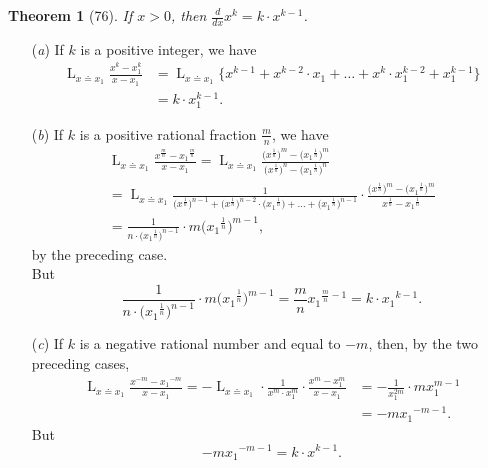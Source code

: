 \documentclass[a4paper,12pt]{book}[2004/02/16]
\providecommand{\colorbox}[2]{#2}
\newcommand{\correction}[2]{\colorbox{corr}{#1}}
\providecommand{\hypertarget}[2]{#2}
\theoremstyle{ilemma}
\theoremstyle{itheorem}
\newtheorem{theorem}{Theorem}
\theoremstyle{iother}
\theoremstyle{icorollary}
\theoremstyle{numcorollary}
\theoremstyle{idefinition}
\renewcommand{\dfrac}[2]{\frac{#1}{#2}}%
\begin{document}
\begin{theorem}[76]\hypertarget{thm76}{}\label{p122t76}
If $x>0$, then $\dfrac{d}{dx}x^k =k\cdot x^{k-1}$.
\end{theorem}
\label{p123}
\begin{enumerate}
\item[(\textit{a})] If $k$ is a positive integer, we have
\begin{align*}
   \mathop{L}_{x\doteq x_1} \frac{x^k-x_1^k}{x-x_1}
&= \mathop{L}_{x\doteq x_1}
   \bigl\{ x^{k-1} + x^{k-2}\cdot x_1 + \ldots
         + x^k\cdot x_1^{k-2}+x_1^{k-1} \bigr\}
\\
&= k\cdot x_1^{k-1}.
\end{align*}

\item[(\textit{b})] If $k$ is a positive rational fraction
$\dfrac{m}{n}$, we have
\begin{gather*}
  \mathop{L}_{x\doteq x_1}
  \frac{x^{\frac mn}-{x_1}^{\frac mn}}{x-x_1}
= \mathop{L}_{x\doteq x_1}
  \frac{\bigl(x^{\frac1n}\bigr)^m
      -\bigl({x_1}^{\frac1n}\bigr)^m}
       {\bigl(x^{\frac1n}\bigr)^n
      -\bigl({x_1}^{\frac1n}\bigr)^n}
\\
= \mathop{L}_{x\doteq x_1}
  \frac{1}{\bigl(x^{\frac1n}\bigr)^{n-1}
          + \bigl(x^{\frac1n}\bigr)^{n-2}\cdot
            \bigl({x_1}^{\frac1n}\bigr) + \ldots
          + \bigl({x_1}^{\frac1n}\bigr)^{n-1}}
  \cdot
  \frac{\bigl(x^{\frac1n}\bigr)^m
      -\bigl({x_1}^{\frac1n}\bigr)^m}
       {x^{\frac1n}-{x_1}^{\frac1n}}
\\
= \frac{1}{n\cdot \bigl({x_1}^{\frac1n}\bigr)^{n-1}} \cdot
  m \bigl({x_1}^{\frac1n}\bigr)^{m-1},
\end{gather*}
by the preceding case.\\
But
\[
  \frac{1}{n\cdot \bigl({x_1}^{\frac1n}\bigr)^{n-1}} \cdot
  m \bigl({x_1}^{\frac1n}\bigr)^{m-1}
= \frac mn{x_1}^{\frac mn-1}
= k\cdot {x_1}^{k-1}.
\]

\item[(\textit{c})] If $k$ is a negative rational number and equal to
$-m$, then, by the two preceding cases,
\begin{align*}
  \mathop{L}_{x\doteq x_1} \frac{x^{-m}-{x_1}^{-m}}{x-x_1}
=-\mathop{L}_{x\doteq x_1} \cdot
  \frac{1}{x^m \cdot x_1^m} \cdot
  \frac{x^m-x_1^m}{x-x_1}
&=-\frac{1}{x_1^{2m}} \cdot mx_1^{m-1}
\\
&=-m{x_1}^{-m-1}\text{\correction{.}{}}
\end{align*}
But
\[
  -m{x_1}^{-m-1} = k\cdot x^{k-1}.
\]


\end{enumerate}
\end{document}
